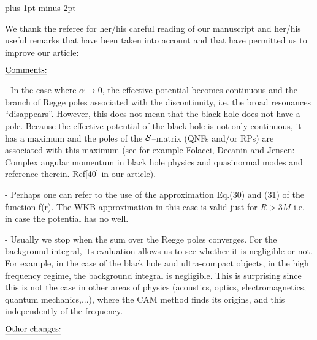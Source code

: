  \baselineskip=12pt plus 1pt minus 2pt
\nopagenumbers



\smallskip
{}

\smallskip
{}




\bigskip
\bigskip

We thank the referee for her/his careful reading of our manuscript and her/his useful remarks that have been taken into account and that have permitted us to improve our article:


\bigskip

\noindent $\underline{\hbox{Comments:}} $
\medskip


\bigskip
\qquad - In the case where $α \rightarrow0$, the effective potential becomes continuous and the branch of Regge poles associated with the discontinuity, i.e. the broad resonances ``disappears''. However, this does not mean that the black hole does not have a pole. Because the effective potential of the black hole is not only continuous, it has a maximum and the poles of the $\cal{S}$--matrix (QNFs and/or RPs) are associated with this maximum (see for example Folacci, Decanin and Jensen: Complex angular momentum in black hole physics and quasinormal modes and reference therein. Ref[40] in our article).


\bigskip
\qquad - Perhaps one can refer to the use of the approximation Eq.(30) and (31) of the function f(r). The WKB approximation  in this case is valid just for $R > 3M$ i.e. in case the potential has no well. 



\bigskip
\qquad -  Usually we stop when the sum over the Regge poles converges. For the background integral, its evaluation allows us to see whether it is negligible or not. For example, in the case of the black hole and ultra-compact objects, in the high frequency regime, the background integral is negligible. This is surprising since this is not the case in other areas of physics (acoustics, optics, electromagnetics, quantum mechanics,...), where the CAM method finds its origins, and this independently of the frequency.


\bigskip\bigskip


\noindent $\underline{\hbox{Other changes:}}  $
\medskip

